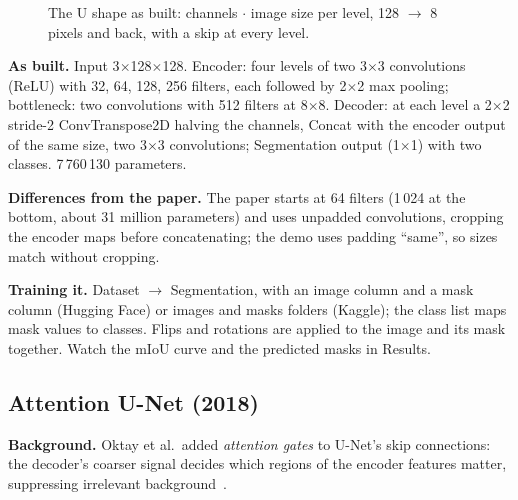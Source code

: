 \documentclass[11pt,a4paper]{article}
\begin{document}
\begin{figure}[htbp]\centering
{}
\caption{The U shape as built: channels $\cdot$ image size per level, 128 $\rightarrow$ 8 pixels and back, with a skip at every level.}
\end{figure}

\textbf{As built.} Input 3$\times$128$\times$128. Encoder: four levels of two 3$\times$3 convolutions (ReLU) with 32, 64, 128, 256
filters, each followed by 2$\times$2 max pooling; bottleneck: two convolutions with 512 filters at 8$\times$8. Decoder: at each level a
2$\times$2 stride-2 ConvTranspose2D halving the channels, Concat with the encoder output of the same size, two 3$\times$3 convolutions;
Segmentation output (1$\times$1) with two classes. 7\,760\,130 parameters.

\textbf{Differences from the paper.} The paper starts at 64 filters (1\,024 at the bottom, about 31 million parameters) and uses
unpadded convolutions, cropping the encoder maps before concatenating; the demo uses padding ``same'', so sizes match without cropping.

\textbf{Training it.} Dataset $\rightarrow$ Segmentation, with an image column and a mask column (Hugging Face) or images and masks
folders (Kaggle); the class list maps mask values to classes. Flips and rotations are applied to the image and its mask together. Watch
the mIoU curve and the predicted masks in Results.

\subsection{Attention U-Net (2018)}
\textbf{Background.} Oktay et al.\ added \emph{attention gates} to U-Net's skip connections: the decoder's coarser signal decides which
regions of the encoder features matter, suppressing irrelevant background~\cite{oktay2018attention}.
\end{document}
